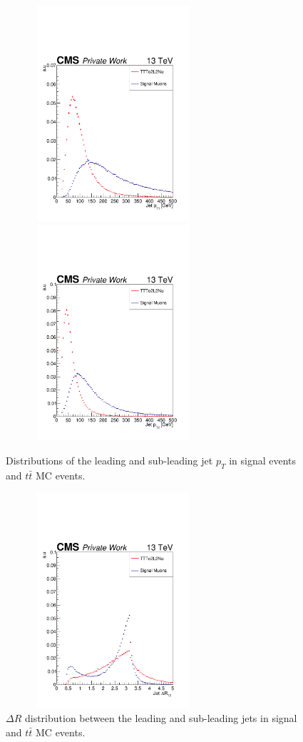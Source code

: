 \documentclass{cernatlasnote}
\begin{document}
\begin{figure}[ht]
\centering
\includegraphics[height=8cm, width=8cm, trim= 0cm 0cm 0cm 0.cm,clip]{images/Jet/JetLeadingPt.pdf}\includegraphics[height=8cm, width=8cm, trim= 0cm 0cm 0cm 0.cm,clip]{images/Jet/JetLeadingPt2.pdf}
\caption{\label{fig:JetPt} Distributions of the leading and sub-leading jet $p_T$ in signal events and $t\bar{t}$ MC events.}
\end{figure}
\FloatBarrier

\begin{figure}[ht]
\centering
\includegraphics[height=8cm, width=8cm, trim= 0cm 0cm 0cm 0.cm,clip]{images/Jet/JetJetdR.pdf}
\caption{\label{fig:JetdR}  $\Delta R$ distribution between the leading and sub-leading jets in signal and $t\bar{t}$ MC events.}
\end{figure}
\FloatBarrier
\end{document}
